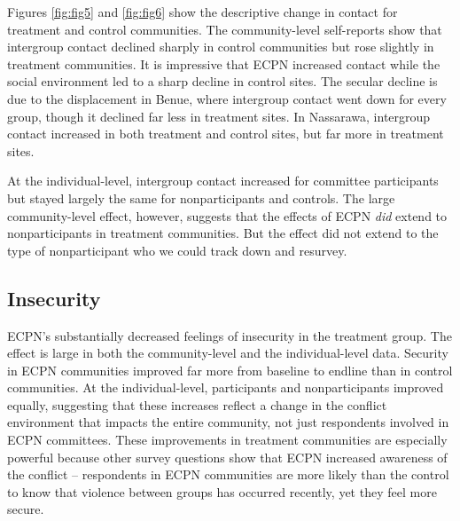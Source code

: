 \documentclass[11pt]{article}
\begin{document}
Figures \ref{fig:fig5} and \ref{fig:fig6} show the descriptive change in
contact for treatment and control communities. The community-level
self-reports show that intergroup contact declined sharply in control
communities but rose slightly in treatment communities. It is impressive
that ECPN increased contact while the social environment led to a sharp
decline in control sites. The secular decline is due to the displacement
in Benue, where intergroup contact went down for every group, though it
declined far less in treatment sites. In Nassarawa, intergroup contact
increased in both treatment and control sites, but far more in treatment
sites.

At the individual-level, intergroup contact increased for committee
participants but stayed largely the same for nonparticipants and
controls. The large community-level effect, however, suggests that the
effects of ECPN \emph{did} extend to nonparticipants in treatment
communities. But the effect did not extend to the type of nonparticipant
who we could track down and resurvey.

\hypertarget{insecurity}{%
\subsection{Insecurity}\label{insecurity}}

ECPN's substantially decreased feelings of insecurity in the treatment
group. The effect is large in both the community-level and the
individual-level data. Security in ECPN communities improved far more
from baseline to endline than in control communities. At the
individual-level, participants and nonparticipants improved equally,
suggesting that these increases reflect a change in the conflict
environment that impacts the entire community, not just respondents
involved in ECPN committees. These improvements in treatment communities
are especially powerful because other survey questions show that ECPN
increased awareness of the conflict -- respondents in ECPN communities
are more likely than the control to know that violence between groups
has occurred recently, yet they feel more secure.
\end{document}
